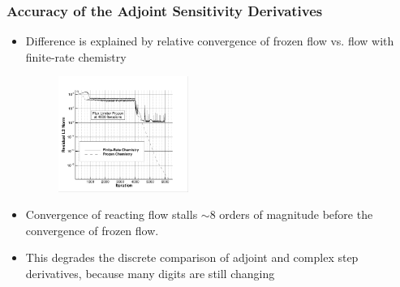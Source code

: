 \documentclass{beamer}
\begin{document}
\begin{frame}
  \frametitle{Accuracy of the Adjoint Sensitivity Derivatives}
  \begin{itemize}
    \item Difference is explained by relative convergence of frozen flow vs.
      flow with finite-rate chemistry
  \begin{figure}
    \centering
    \includegraphics[width=0.4\textwidth]{figures/limiters/chem-res-comp.png}
  \end{figure}
    \item Convergence of reacting flow stalls $\sim 8$ orders of magnitude
      before the convergence of frozen flow.
    \item This degrades the discrete comparison of adjoint and complex step
      derivatives, because many digits are still changing
  \end{itemize}
\end{frame}
\end{document}
